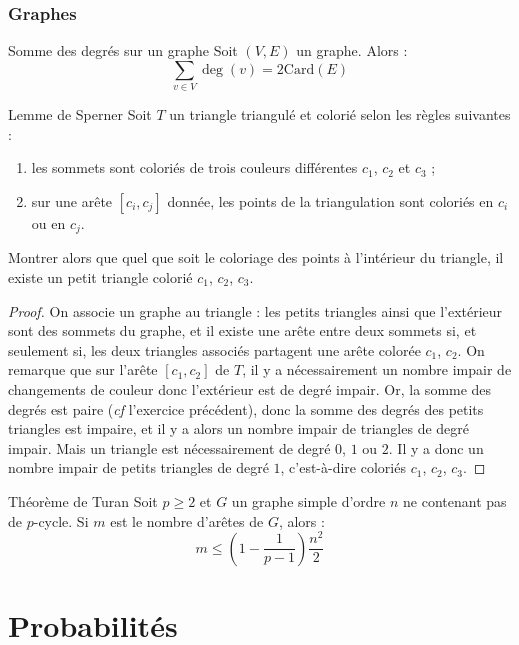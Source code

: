 \documentclass[french]{book}
\newcommand{\card}{\text{Card}}
\theoremstyle{plain}
\theoremstyle{definition}
\theoremstyle{remark}
\begin{document}
\subsection{Graphes}
\begin{EX}{Somme des degrés sur un graphe}
	Soit $(V,E)$ un graphe. Alors : $$\sum_{v\in V}\deg(v)=2\card(E)$$	
\end{EX}
\begin{EX}{Lemme de Sperner}
	Soit $T$ un triangle triangulé et colorié selon les règles suivantes : 
	\begin{enumerate}
		\item les sommets sont coloriés de trois couleurs différentes $c_1$, $c_2$ et $c_3$ ; 
		\item sur une arête $[c_i,c_j]$ donnée, les points de la triangulation sont coloriés en $c_i$ ou en $c_j$.
	\end{enumerate}
	Montrer alors que quel que soit le coloriage des points à l'intérieur du triangle, il existe un petit triangle colorié $c_1$, $c_2$, $c_3$.
\end{EX}
\begin{proof}
	On associe un graphe au triangle : les petits triangles ainsi que l'extérieur sont des sommets du graphe, et il existe une arête entre deux sommets si, et seulement si, les deux triangles associés partagent une arête colorée $c_1$, $c_2$. On remarque que sur l'arête $[c_1,c_2]$ de $T$, il y a nécessairement un nombre impair de changements de couleur donc l'extérieur est de degré impair. Or, la somme des degrés est paire (\textit{cf} l'exercice précédent), donc la somme des degrés des petits triangles est impaire, et il y a alors un nombre impair de triangles de degré impair. Mais un triangle est nécessairement de degré $0$, $1$ ou $2$. Il y a donc un nombre impair de petits triangles de degré $1$, c'est-à-dire coloriés $c_1$, $c_2$, $c_3$.
\end{proof}
\begin{EX}{Théorème de Turan}
	Soit $p\geqslant2$ et $G$ un graphe simple d'ordre $n$ ne contenant pas de $p$-cycle. Si $m$ est le nombre d'arêtes de $G$, alors : $$m\leqslant\left(1-\frac{1}{p-1}\right)\frac{n^2}{2}$$
\end{EX}


\chapter{Probabilités}
\localtableofcontents
\end{document}
